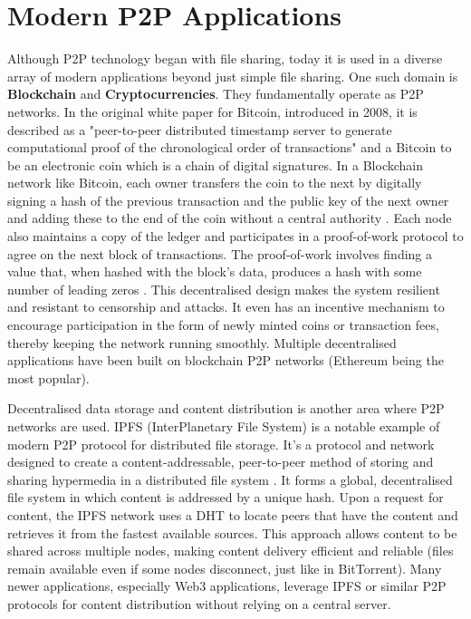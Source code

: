 \documentclass[12pt,a4paper]{report}
\begin{document}
\section{Modern P2P Applications}
Although P2P technology began with file sharing, today it is used in a diverse array of modern applications beyond just simple file sharing. One such domain is \textbf{Blockchain} and \textbf{Cryptocurrencies}. They fundamentally operate as P2P networks. In the original white paper for Bitcoin, introduced in 2008, it is described as a "peer-to-peer distributed timestamp server to generate computational proof of the chronological order of transactions" and a Bitcoin to be an electronic coin which is a chain of digital signatures. In a Blockchain network like Bitcoin, each owner transfers the coin to the next by digitally signing a hash of the previous transaction and the public key of the next owner and adding these to the end of the coin without a central authority \cite{bitcoin}. Each node also maintains a copy of the ledger and participates in a proof-of-work protocol to agree on the next block of transactions. The proof-of-work involves finding a value that, when hashed with the block's data, produces a hash with some number of leading zeros \cite{bitcoin}. This decentralised design makes the system resilient and resistant to censorship and attacks. It even has an incentive mechanism to encourage participation in the form of newly minted coins or transaction fees, thereby keeping the network running smoothly. Multiple decentralised applications have been built on blockchain P2P networks (Ethereum being the most popular).

Decentralised data storage and content distribution is another area where P2P networks are used. IPFS (InterPlanetary File System) is a notable example of modern P2P protocol for distributed file storage. It's a protocol and network designed to create a content-addressable, peer-to-peer method of storing and sharing hypermedia in a distributed file system \cite{IPFS}. It forms a global, decentralised file system in which content is addressed by a unique hash. Upon a request for content, the IPFS network uses a DHT to locate peers that have the content and retrieves it from the fastest available sources. This approach allows content to be shared across multiple nodes, making content delivery efficient and reliable (files remain available even if some nodes disconnect, just like in BitTorrent). Many newer applications, especially Web3 applications, leverage IPFS or similar P2P protocols for content distribution without relying on a central server.
\end{document}
